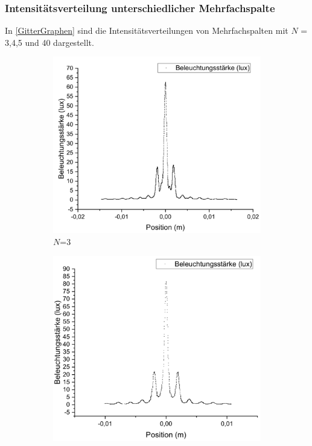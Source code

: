 \documentclass[
	a4paper,
	12pt,
	pagesize,
	ngerman
]{scrartcl}
\begin{document}
	\subsubsection{Intensitätsverteilung unterschiedlicher Mehrfachspalte} 
	In \cref{GitterGraphen} sind die Intensitätsverteilungen von Mehrfachspalten mit $N$ = 3,4,5 und 40 dargestellt. 
	

	\begin{figure}[H]
		\centering
		\begin{subfigure}{.5\textwidth}
			\centering
			\includegraphics[width=1\linewidth]{GitterN3ZOOM}
			\caption{$N$=3}	
		\end{subfigure}%
		\begin{subfigure}{.5\textwidth}
			\centering
			\includegraphics[width=1\linewidth]{GitterN4ZOOM}

\end{subfigure}
\end{figure}
\end{document}
